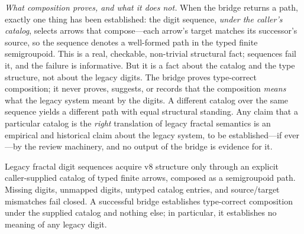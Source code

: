 \emph{What composition proves, and what it does not.} When the bridge returns a path, exactly one thing has been established: the digit sequence, \emph{under the caller's catalog}, selects arrows that compose---each arrow's target matches its successor's source, so the sequence denotes a well-formed path in the typed finite semigroupoid. This is a real, checkable, non-trivial structural fact; sequences fail it, and the failure is informative. But it is a fact about the catalog and the type structure, not about the legacy digits. The bridge proves type-correct composition; it never proves, suggests, or records that the composition \emph{means} what the legacy system meant by the digits. A different catalog over the same sequence yields a different path with equal structural standing. Any claim that a particular catalog is the \emph{right} translation of legacy fractal semantics is an empirical and historical claim about the legacy system, to be established---if ever---by the review machinery, and no output of the bridge is evidence for it.

\begin{ruleenv}\label{ch08:rule:bridge}
Legacy fractal digit sequences acquire v8 structure only through an explicit caller-supplied catalog of typed finite arrows, composed as a semigroupoid path. Missing digits, unmapped digits, untyped catalog entries, and source/target mismatches fail closed. A successful bridge establishes type-correct composition under the supplied catalog and nothing else; in particular, it establishes no meaning of any legacy digit.
\end{ruleenv}

